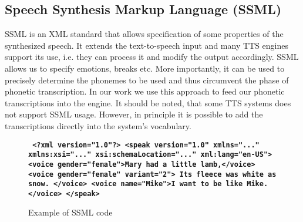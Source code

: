 \subsection*{Speech Synthesis Markup Language (SSML)}
\label{SSML}
\cite{taylor1997ssml}
SSML is an XML standard that allows specification of some properties of the synthesized speech.
It extends the text-to-speech input and many TTS engines support its use, i.e. they can process it and modify the output accordingly.
SSML allows us to specify emotions, breaks etc.
More importantly, it can be used to precisely determine the phonemes to be used and thus circumvent the phase of phonetic transcription.
In our work we use this approach to feed our phonetic transcriptions into the engine.
It should be noted, that some TTS systems does not support SSML usage.
However, in principle it is possible to add the transcriptions directly into the system's vocabulary.
\begin{center}
\begin{figure}
\textbf{\texttt{
<?xml version="1.0"?>
<speak version="1.0" xmlns="..."
         xmlns:xsi="..."
         xsi:schemaLocation="..."
         xml:lang="en-US">\linebreak
  \tab <voice gender="female">Mary had a little lamb,</voice>\linebreak
  \tab <voice gender="female" variant="2">\linebreak
  \tab\tab Its fleece was white as snow.\linebreak
  \tab</voice>\linebreak
  \tab<voice name="Mike">I want to be like Mike.</voice>\linebreak
</speak>
}}
\label{ssml_example}
\caption{Example of SSML code}
\end{figure}
\end{center}

